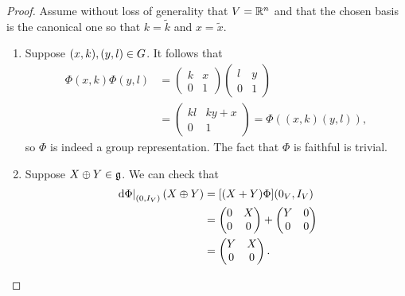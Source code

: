 \begin{proof}
    Assume without loss of generality that $V = \mathbb{R}^n$
    and that the chosen basis is the canonical one so that $k = \tilde k$ and $x = \tilde x$.

    \begin{enumerate}
        \item
            Suppose $(x, k), (y, l) \in G$.
            It follows that
            \begin{align*}
                \Phi(x, k) \Phi(y, l)
                &=
                \begin{pmatrix}
                    k & x\\
                    0 & 1
                \end{pmatrix}
                \begin{pmatrix}
                    l & y\\
                    0 & 1
                \end{pmatrix}\\
                &=
                \begin{pmatrix}
                    kl & ky + x\\
                    0 & 1
                \end{pmatrix}
                = \Phi((x, k) (y, l)),
            \end{align*}
            so $\Phi$ is indeed a group representation.
            The fact that $\Phi$ is faithful is trivial.
        \item
            Suppose $X \oplus Y \in \mathfrak{g}$.
            We can check that
            \begin{align*}
                \left. \,\mathrm{d} \Phi \right|_{(0, {I_{V}})} (X \oplus Y)
                &=
                [({X} + {Y}) \Phi]
                (0_V, {I_{V}})\\
                &=
                \begin{pmatrix}
                    0 & X\\
                    0 & 0
                \end{pmatrix}
                +
                \begin{pmatrix}
                    Y & 0\\
                    0 & 0
                \end{pmatrix}\\
                &=
                \begin{pmatrix}
                    Y & X\\
                    0 & 0
                \end{pmatrix}.
            \end{align*}


\end{enumerate}
\end{proof}
